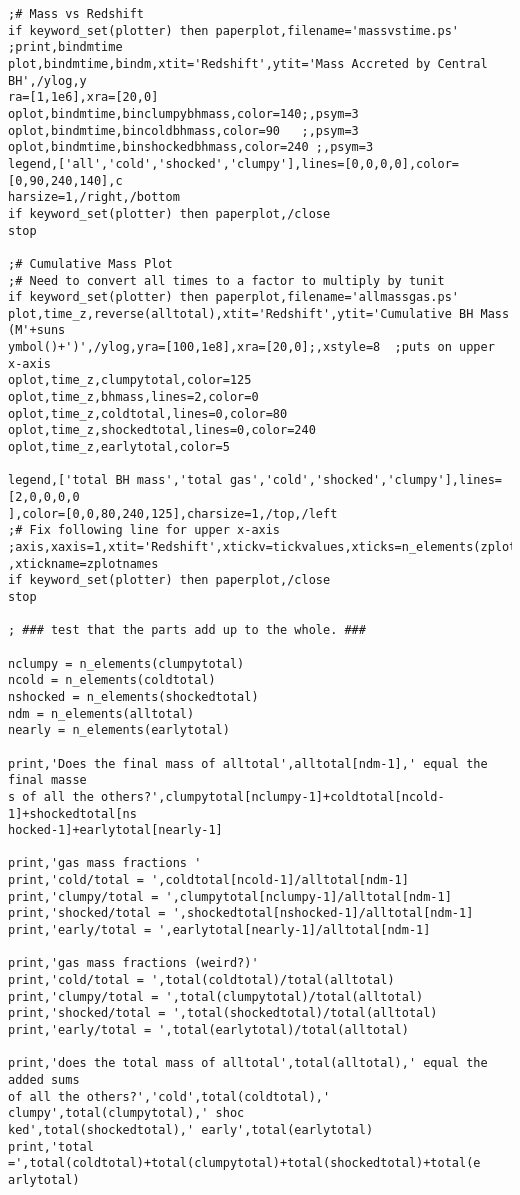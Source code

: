 \documentclass[12pt,headA,chapB]{fiskthesis}
\begin{document}
\begin{verbatim}
;# Mass vs Redshift
if keyword_set(plotter) then paperplot,filename='massvstime.ps'
;print,bindmtime
plot,bindmtime,bindm,xtit='Redshift',ytit='Mass Accreted by Central BH',/ylog,y
ra=[1,1e6],xra=[20,0]
oplot,bindmtime,binclumpybhmass,color=140;,psym=3
oplot,bindmtime,bincoldbhmass,color=90   ;,psym=3
oplot,bindmtime,binshockedbhmass,color=240 ;,psym=3
legend,['all','cold','shocked','clumpy'],lines=[0,0,0,0],color=[0,90,240,140],c
harsize=1,/right,/bottom
if keyword_set(plotter) then paperplot,/close
stop

;# Cumulative Mass Plot
;# Need to convert all times to a factor to multiply by tunit
if keyword_set(plotter) then paperplot,filename='allmassgas.ps'
plot,time_z,reverse(alltotal),xtit='Redshift',ytit='Cumulative BH Mass (M'+suns
ymbol()+')',/ylog,yra=[100,1e8],xra=[20,0];,xstyle=8  ;puts on upper x-axis
oplot,time_z,clumpytotal,color=125
oplot,time_z,bhmass,lines=2,color=0
oplot,time_z,coldtotal,lines=0,color=80
oplot,time_z,shockedtotal,lines=0,color=240
oplot,time_z,earlytotal,color=5

legend,['total BH mass','total gas','cold','shocked','clumpy'],lines=[2,0,0,0,0
],color=[0,0,80,240,125],charsize=1,/top,/left
;# Fix following line for upper x-axis
;axis,xaxis=1,xtit='Redshift',xtickv=tickvalues,xticks=n_elements(zplotnames)-1
,xtickname=zplotnames
if keyword_set(plotter) then paperplot,/close
stop

; ### test that the parts add up to the whole. ###

nclumpy = n_elements(clumpytotal)
ncold = n_elements(coldtotal)
nshocked = n_elements(shockedtotal)
ndm = n_elements(alltotal)
nearly = n_elements(earlytotal)

print,'Does the final mass of alltotal',alltotal[ndm-1],' equal the final masse
s of all the others?',clumpytotal[nclumpy-1]+coldtotal[ncold-1]+shockedtotal[ns
hocked-1]+earlytotal[nearly-1]

print,'gas mass fractions '
print,'cold/total = ',coldtotal[ncold-1]/alltotal[ndm-1]
print,'clumpy/total = ',clumpytotal[nclumpy-1]/alltotal[ndm-1]
print,'shocked/total = ',shockedtotal[nshocked-1]/alltotal[ndm-1]
print,'early/total = ',earlytotal[nearly-1]/alltotal[ndm-1]

print,'gas mass fractions (weird?)'
print,'cold/total = ',total(coldtotal)/total(alltotal)
print,'clumpy/total = ',total(clumpytotal)/total(alltotal)
print,'shocked/total = ',total(shockedtotal)/total(alltotal)
print,'early/total = ',total(earlytotal)/total(alltotal)

print,'does the total mass of alltotal',total(alltotal),' equal the added sums 
of all the others?','cold',total(coldtotal),' clumpy',total(clumpytotal),' shoc
ked',total(shockedtotal),' early',total(earlytotal)
print,'total =',total(coldtotal)+total(clumpytotal)+total(shockedtotal)+total(e
arlytotal)



\end{verbatim}
\end{document}
